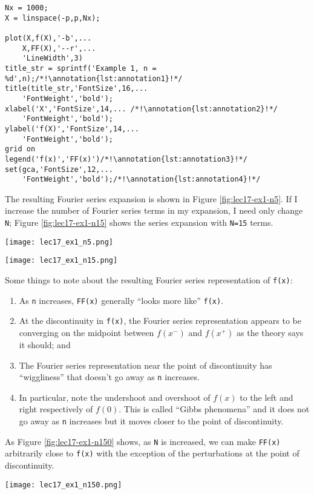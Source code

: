 \begin{lstlisting}[name=lec17-ex1]
Nx = 1000;
X = linspace(-p,p,Nx);

plot(X,f(X),'-b',...
    X,FF(X),'--r',...
    'LineWidth',3)
title_str = sprintf('Example 1, n = %d',n);/*!\annotation{lst:annotation1}!*/
title(title_str,'FontSize',16,...
    'FontWeight','bold');
xlabel('X','FontSize',14,... /*!\annotation{lst:annotation2}!*/
    'FontWeight','bold');
ylabel('f(X)','FontSize',14,...
    'FontWeight','bold');
grid on
legend('f(x)','FF(x)')/*!\annotation{lst:annotation3}!*/
set(gca,'FontSize',12,...
    'FontWeight','bold');/*!\annotation{lst:annotation4}!*/
\end{lstlisting} \setcounter{lstannotation}{0}
The resulting Fourier series expansion is shown in Figure \ref{fig:lec17-ex1-n5}. If I increase the number of Fourier series terms in my expansion, I need only change \lstinline{N}; Figure \ref{fig:lec17-ex1-n15} shows the series expansion with \lstinline{N=15} terms.
\begin{marginfigure}
\texttt{[image: lec17\_ex1\_n5.png]}
\caption{Fourier series expansion with \lstinline{N=5}.}
\label{fig:lec17-ex1-n5}
\end{marginfigure}

\begin{marginfigure}
\texttt{[image: lec17\_ex1\_n15.png]}
\caption{Fourier series expansion with \lstinline{N=15}.}
\label{fig:lec17-ex1-n15}
\end{marginfigure} 
Some things to note about the resulting Fourier series representation of \lstinline{f(x)}:
\begin{enumerate}
\item As \lstinline{n} increases, \lstinline{FF(x)} generally ``looks more like'' \lstinline{f(x)}.  
\item At the discontinuity in \lstinline{f(x)}, the Fourier series representation appears to be converging on the midpoint between $f(x^-)$ and $f(x^+)$ as the theory says it should; and
\item The Fourier series representation near the point of discontinuity has ``wiggliness'' that doesn't go away as \lstinline{n} increases.
\item In particular, note the undershoot and overshoot of $f(x)$ to the left and right respectively of $f(0)$.  This is called ``Gibbs phenomena'' and it does not go away as \lstinline{n} increases but it moves closer to the point of discontinuity.  
\end{enumerate}
As Figure \ref{fig:lec17-ex1-n150} shows, as \lstinline{N} is increased, we can make \lstinline{FF(x)} arbitrarily close to \lstinline{f(x)} with the exception of the perturbations at the point of discontinuity.
\begin{marginfigure}
\texttt{[image: lec17\_ex1\_n150.png]}
\caption{Fourier series expansion with \lstinline{N=150}.}
\label{fig:lec17-ex1-n150}
\end{marginfigure}

